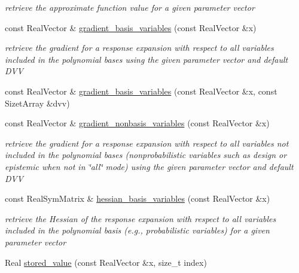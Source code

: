 \begin{DoxyCompactItemize}
\begin{DoxyCompactList}\small\item\em retrieve the approximate function value for a given parameter vector \end{DoxyCompactList}\item 
const Real\+Vector \& \hyperlink{classPecos_1_1NodalInterpPolyApproximation_ae3b6ea541392b74cf0cc8758e206277c}{gradient\+\_\+basis\+\_\+variables} (const Real\+Vector \&x)\label{classPecos_1_1NodalInterpPolyApproximation_ae3b6ea541392b74cf0cc8758e206277c}

\begin{DoxyCompactList}\small\item\em retrieve the gradient for a response expansion with respect to all variables included in the polynomial bases using the given parameter vector and default D\+VV \end{DoxyCompactList}\item 
const Real\+Vector \& \hyperlink{classPecos_1_1NodalInterpPolyApproximation_a3ffb563ae1658344bfc2ad882def9e7c}{gradient\+\_\+basis\+\_\+variables} (const Real\+Vector \&x, const Sizet\+Array \&dvv)
\item 
const Real\+Vector \& \hyperlink{classPecos_1_1NodalInterpPolyApproximation_a518e8604f973a4b161a9b5718a0aa25e}{gradient\+\_\+nonbasis\+\_\+variables} (const Real\+Vector \&x)\label{classPecos_1_1NodalInterpPolyApproximation_a518e8604f973a4b161a9b5718a0aa25e}

\begin{DoxyCompactList}\small\item\em retrieve the gradient for a response expansion with respect to all variables not included in the polynomial bases (nonprobabilistic variables such as design or epistemic when not in \char`\"{}all\char`\"{} mode) using the given parameter vector and default D\+VV \end{DoxyCompactList}\item 
const Real\+Sym\+Matrix \& \hyperlink{classPecos_1_1NodalInterpPolyApproximation_a830729654265d84af637960f8c63f2bc}{hessian\+\_\+basis\+\_\+variables} (const Real\+Vector \&x)\label{classPecos_1_1NodalInterpPolyApproximation_a830729654265d84af637960f8c63f2bc}

\begin{DoxyCompactList}\small\item\em retrieve the Hessian of the response expansion with respect to all variables included in the polynomial basis (e.\+g., probabilistic variables) for a given parameter vector \end{DoxyCompactList}\item 
Real \hyperlink{classPecos_1_1NodalInterpPolyApproximation_a1abe918dbdc66ac0fde85f1ab3c061af}{stored\+\_\+value} (const Real\+Vector \&x, size\+\_\+t index)\label{classPecos_1_1NodalInterpPolyApproximation_a1abe918dbdc66ac0fde85f1ab3c061af}


\end{DoxyCompactItemize}
